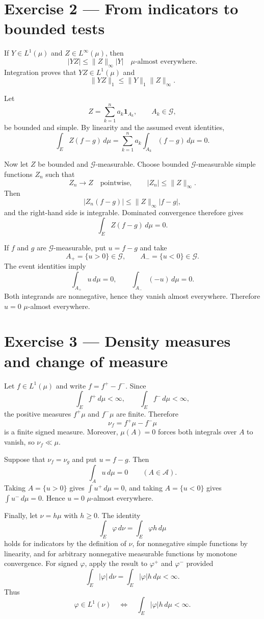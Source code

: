 \section*{Exercise 2 — From indicators to bounded tests}

If $Y\in L^1(\mu)$ and $Z\in L^\infty(\mu)$, then
\[
|YZ|
\le
\|Z\|_\infty |Y|
\quad\mu\text{-almost everywhere}.
\]
Integration proves that $YZ\in L^1(\mu)$ and
\[
\|YZ\|_1\le\|Y\|_1\|Z\|_\infty.
\]

Let
\[
Z=\sum_{k=1}^n a_k\mathbf 1_{A_k},
\qquad
A_k\in\mathcal G,
\]
be bounded and simple. By linearity and the assumed event identities,
\[
\int_EZ(f-g)\,d\mu
=
\sum_{k=1}^n a_k\int_{A_k}(f-g)\,d\mu
=0.
\]

Now let $Z$ be bounded and $\mathcal G$-measurable. Choose bounded $\mathcal G$-measurable simple functions $Z_n$ such that
\[
Z_n\longrightarrow Z
\quad\text{pointwise},
\qquad
|Z_n|\le\|Z\|_\infty.
\]
Then
\[
|Z_n(f-g)|
\le
\|Z\|_\infty |f-g|,
\]
and the right-hand side is integrable. Dominated convergence therefore gives
\[
\int_EZ(f-g)\,d\mu=0.
\]

If $f$ and $g$ are $\mathcal G$-measurable, put $u=f-g$ and take
\[
A_+=\{u>0\}\in\mathcal G,
\qquad
A_-=\{u<0\}\in\mathcal G.
\]
The event identities imply
\[
\int_{A_+}u\,d\mu=0,
\qquad
\int_{A_-}(-u)\,d\mu=0.
\]
Both integrands are nonnegative, hence they vanish almost everywhere. Therefore $u=0$ $\mu$-almost everywhere.

\section*{Exercise 3 — Density measures and change of measure}

Let $f\in L^1(\mu)$ and write $f=f^+-f^-$. Since
\[
\int_Ef^+\,d\mu<\infty,
\qquad
\int_Ef^-\,d\mu<\infty,
\]
the positive measures $f^+\mu$ and $f^-\mu$ are finite. Therefore
\[
\nu_f=f^+\mu-f^-\mu
\]
is a finite signed measure. Moreover, $\mu(A)=0$ forces both integrals over $A$ to vanish, so $\nu_f\ll\mu$.

Suppose that $\nu_f=\nu_g$ and put $u=f-g$. Then
\[
\int_Au\,d\mu=0
\qquad(A\in\mathcal A).
\]
Taking $A=\{u>0\}$ gives $\int u^+\,d\mu=0$, and taking $A=\{u<0\}$ gives $\int u^-\,d\mu=0$. Hence $u=0$ $\mu$-almost everywhere.

Finally, let $\nu=h\mu$ with $h\ge0$. The identity
\[
\int_E\varphi\,d\nu
=
\int_E\varphi h\,d\mu
\]
holds for indicators by the definition of $\nu$, for nonnegative simple functions by linearity, and for arbitrary nonnegative measurable functions by monotone convergence. For signed $\varphi$, apply the result to $\varphi^+$ and $\varphi^-$ provided
\[
\int_E|\varphi|\,d\nu
=
\int_E|\varphi|h\,d\mu
<\infty.
\]
Thus
\[
\varphi\in L^1(\nu)
\quad\Longleftrightarrow\quad
\int_E|\varphi|h\,d\mu<\infty.
\]

